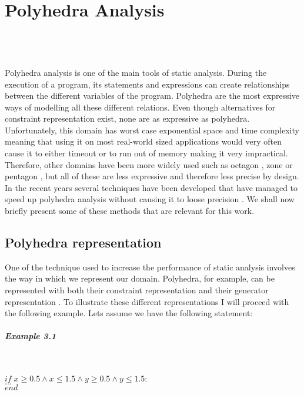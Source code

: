 
\chapter{Polyhedra Analysis}
\mbox{}\\
\mbox{}\\
\mbox{}\\
Polyhedra analysis is one of the main tools of static analysis\cite{cousot1977abstract}. During the execution of a program, its statements and expressions can create relationships between the different variables of the program. Polyhedra are the most expressive ways of modelling all these different relations. Even though alternatives for constraint representation exist, none are as expressive as polyhedra. Unfortunately, this domain has worst case exponential space and time complexity meaning that using it on most real-world sized applications would very often cause it to either timeout or to run out of memory making it very impractical. Therefore, other domains have been more widely used such as octagon \cite{mine2006octagon}, zone \cite{mine2001new} or pentagon \cite{logozzo2010pentagons} , but all of these are less expressive and therefore less precise by design. In the recent years several techniques have been developed that have managed to speed up polyhedra analysis without causing it to loose precision \cite{gange2016exploiting,jourdan2017sparsity,marechal2017efficient}. We shall now briefly present some of these methods that are relevant for this work.

\section{Polyhedra representation}
One of the technique used to increase the performance of static analysis involves the way in which we represent our domain\cite{singh2015making}. Polyhedra, for example, can be represented with both their constraint representation and their generator representation\cite{motzkin1953double} . To illustrate these different representations I will proceed with the following example. Lets assume we have the following statement:
\paragraph{Example 3.1}\mbox{}\\
\begin{center}
	$if \; x\geq0.5\wedge x\leq 1.5 \wedge y\geq 0.5 \wedge y \leq1.5: $\\
	$...\;\;\;\;\;$\\
	$end \qquad\qquad\qquad\qquad\qquad\qquad\qquad\qquad$
\end{center}

